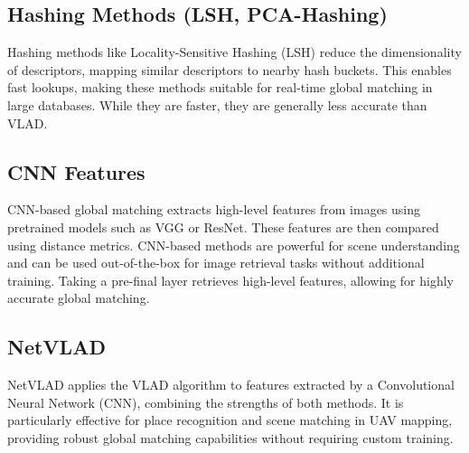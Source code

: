\subsection*{Hashing Methods (LSH, PCA-Hashing)}
Hashing methods like Locality-Sensitive Hashing (LSH) reduce the dimensionality of descriptors, mapping similar descriptors to nearby hash buckets. This enables fast lookups, making these methods suitable for real-time global matching in large databases. While they are faster, they are generally less accurate than VLAD.

\subsection*{CNN Features}
CNN-based global matching extracts high-level features from images using pretrained models such as VGG or ResNet. These features are then compared using distance metrics. CNN-based methods are powerful for scene understanding and can be used out-of-the-box for image retrieval tasks without additional training. Taking a pre-final layer retrieves high-level features, allowing for highly accurate global matching.

\subsection*{NetVLAD}
NetVLAD applies the VLAD algorithm to features extracted by a Convolutional Neural Network (CNN), combining the strengths of both methods. It is particularly effective for place recognition and scene matching in UAV mapping, providing robust global matching capabilities without requiring custom training.
